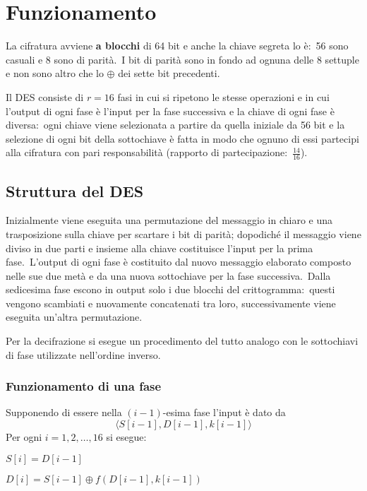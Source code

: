 \section{Funzionamento}

La cifratura avviene \textbf{a blocchi} di 64 bit e anche la chiave segreta lo è:\ 56 sono casuali e 8 sono di parità.\
I bit di parità sono in fondo ad ognuna delle 8 settuple e non sono altro che lo $\oplus$ dei sette bit precedenti.\

Il DES consiste di $r=16$ fasi in cui si ripetono le stesse operazioni e in cui l'output di ogni fase è l'input per la fase successiva e la chiave di ogni fase è diversa:\ ogni chiave viene selezionata a partire da quella iniziale da 56 bit e la selezione di ogni bit della sottochiave è fatta in modo che ognuno di essi partecipi alla cifratura con pari responsabilità (rapporto di partecipazione:\ $\frac{14}{16}$).\

\subsection{Struttura del DES}

Inizialmente viene eseguita una permutazione del messaggio in chiaro e una trasposizione sulla chiave per scartare i bit di parità; dopodiché il messaggio viene diviso in due parti e insieme alla chiave costituisce l'input per la prima fase.\
L'output di ogni fase è costituito dal nuovo messaggio elaborato composto nelle sue due metà e da una nuova sottochiave per la fase successiva.\
Dalla sedicesima fase escono in output solo i due blocchi del crittogramma:\ questi vengono scambiati e nuovamente concatenati tra loro, successivamente viene eseguita un'altra permutazione.\

Per la decifrazione si esegue un procedimento del tutto analogo con le sottochiavi di fase utilizzate nell'ordine inverso.\

\subsubsection{Funzionamento di una fase}

Supponendo di essere nella $(i-1)$-esima fase l'input è dato da \[\langle S[i-1], D[i-1], k[i-1] \rangle\]
Per ogni $i=1,2,\dots,16$ si esegue:

\begin{flushleft}
    $S[i] = D[i-1]$

    $D[i] = S[i-1] \oplus f(D[i-1], k[i-1])$
\end{flushleft}

